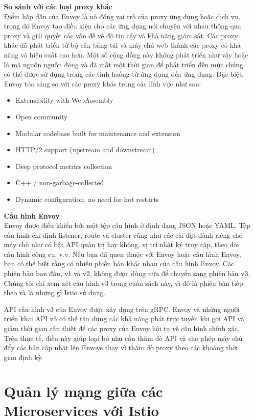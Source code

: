 \documentclass[12pt,a4paper]{report}
\begin{document}
		\textbf{So sánh với các loại proxy khác}\\
		Điểm hấp dẫn của Envoy là nó đóng vai trò của proxy ứng dụng hoặc dịch vụ, trong đó Envoy tạo điều kiện cho các ứng dụng nói chuyện với nhau thông qua proxy và giải quyết các vấn đề về độ tin cậy và khả năng giám sát. Các proxy khác đã phát triển từ bộ cân bằng tải và máy chủ web thành các proxy có khả năng và hiệu suất cao hơn. Một số cộng đồng này không phát triển như vậy hoặc là mã nguồn nguồn đóng và đã mất một thời gian để phát triển đến mức chúng có thể được sử dụng trong các tình huống từ ứng dụng đến ứng dụng. Đặc biệt, Envoy tỏa sáng so với các proxy khác trong các lĩnh vực như sau:
		\begin{itemize}
			\item Extensibility with WebAssembly
			\item Open community
			\item Modular codebase built for maintenance and extension
			\item HTTP/2 support (upstream and downstream)
			\item Deep protocol metrics collection
			\item C++ / non-garbage-collected
			\item Dynamic configuration, no need for hot restarts
		\end{itemize}
	
		\textbf{Cấu hình Envoy}\\
		
		Envoy được điều khiển bởi một tệp cấu hình ở định dạng JSON hoặc YAML. Tệp cấu hình chỉ định listener, route và cluster cũng như các cài đặt dành riêng cho máy chủ như có bật API quản trị hay không, vị trí nhật ký truy cập, theo dõi cấu hình công cụ, v.v. Nếu bạn đã quen thuộc với Envoy hoặc cấu hình Envoy, bạn có thể biết rằng có nhiều phiên bản khác nhau của cấu hình Envoy. Các phiên bản ban đầu, v1 và v2, không được dùng nữa để chuyển sang phiên bản v3. Chúng tôi chỉ xem xét cấu hình v3 trong cuốn sách này, vì đó là phiên bản tiếp theo và là những gì Istio sử dụng.
		
		API cấu hình v3 của Envoy được xây dựng trên gRPC. Envoy và những người triển khai API v3 có thể tận dụng các khả năng phát trực tuyến khi gọi API và giảm thời gian cần thiết để các proxy của Envoy hội tụ về cấu hình chính xác. Trên thực tế, điều này giúp loại bỏ nhu cầu thăm dò API và cho phép máy chủ đẩy các bản cập nhật lên Envoys thay vì thăm dò proxy theo các khoảng thời gian định kỳ.
	\section{Quản lý mạng giữa các Microservices với Istio}
\end{document}
